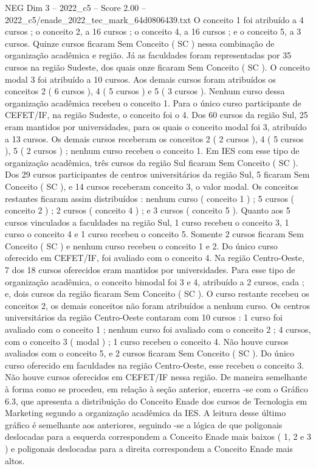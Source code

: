 \begin{textsample}{NEG Dim 3 – 2022\_c5 – Score 2.00 – 2022\_c5/enade\_2022\_tec\_mark\_64d0806439.txt}
O conceito 1 foi atribuído a 4 cursos ; o conceito 2, a 16 cursos ; o conceito 4, a 16 cursos ; e o conceito 5, a 3 cursos.
Quinze cursos ficaram Sem Conceito ( SC ) nessa combinação de organização acadêmica e região.
Já as faculdades foram representadas por 35 cursos na região Sudeste, dos quais onze ficaram Sem Conceito ( SC ).
O conceito modal 3 foi atribuído a 10 cursos.
Aos demais cursos foram atribuídos os conceitos 2 ( 6 cursos ), 4 ( 5 cursos ) e 5 ( 3 cursos ).
Nenhum curso dessa organização acadêmica recebeu o conceito 1.
Para o único curso participante de CEFET/IF, na região Sudeste, o conceito foi o 4.
Dos 60 cursos da região Sul, 25 eram mantidos por universidades, para os quais o conceito modal foi 3, atribuído a 13 cursos.
Os demais cursos receberam os conceitos 2 ( 2 cursos ), 4 ( 5 cursos ), 5 ( 2 cursos ) ; nenhum curso recebeu o conceito 1.
Em IES com esse tipo de organização acadêmica, três cursos da região Sul ficaram Sem Conceito ( SC ).
Dos 29 cursos participantes de centros universitários da região Sul, 5 ficaram Sem Conceito ( SC ), e 14 cursos receberam conceito 3, o valor modal.
Os conceitos restantes ficaram assim distribuídos : nenhum curso ( conceito 1 ) ; 5 cursos ( conceito 2 ) ; 2 cursos ( conceito 4 ) ; e 3 cursos ( conceito 5 ).
Quanto aos 5 cursos vinculados a faculdades na região Sul, 1 curso recebeu o conceito 3, 1 curso o conceito 4 e 1 curso recebeu o conceito 5.
Somente 2 cursos ficaram Sem Conceito ( SC ) e nenhum curso recebeu o conceito 1 e 2.
Do único curso oferecido em CEFET/IF, foi avaliado com o conceito 4.
Na região Centro-Oeste, 7 dos 18 cursos oferecidos eram mantidos por universidades.
Para esse tipo de organização acadêmica, o conceito bimodal foi 3 e 4, atribuído a 2 cursos, cada ; e, dois cursos da região ficaram Sem Conceito ( SC ).
O curso restante recebeu os conceitos 2, os demais conceitos não foram atribuídos a nenhum curso.
Os centros universitários da região Centro-Oeste contaram com 10 cursos : 1 curso foi avaliado com o conceito 1 ; nenhum curso foi avaliado com o conceito 2 ; 4 cursos, com o conceito 3 ( modal ) ; 1 curso recebeu o conceito 4.
Não houve cursos avaliados com o conceito 5, e 2 cursos ficaram Sem Conceito ( SC ).
Do único curso oferecido em faculdades na região Centro-Oeste, esse recebeu o conceito 3.
Não houve cursos oferecidos em CEFET/IF nessa região.
De maneira semelhante à forma como se procedeu, em relação à seção anterior, encerra -se com o Gráfico 6.3, que apresenta a distribuição do Conceito Enade dos cursos de Tecnologia em Marketing segundo a organização acadêmica da IES.
A leitura desse último gráfico é semelhante aos anteriores, seguindo -se a lógica de que poligonais deslocadas para a esquerda correspondem a Conceito Enade mais baixos ( 1, 2 e 3 ) e poligonais deslocadas para a direita correspondem a Conceito Enade mais altos.

\end{textsample}
